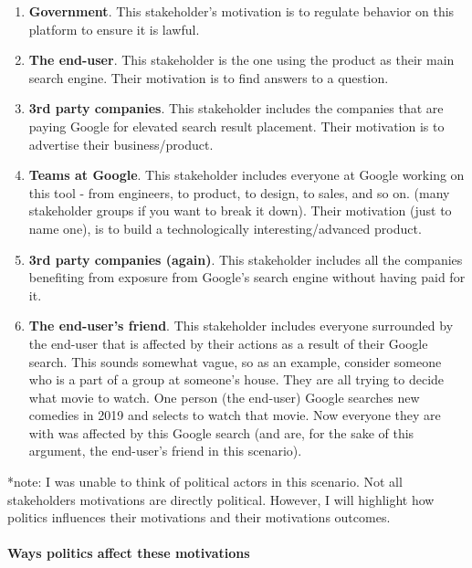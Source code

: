 \begin{enumerate}
\item
  \textbf{Government}. This stakeholder's motivation is to regulate behavior on this platform to ensure it is lawful.
\item
  \textbf{The end-user}. This stakeholder is the one using the product as their main search engine. Their motivation is to find answers to a question.
\item
  \textbf{3rd party companies}. This stakeholder includes the companies that are paying Google for elevated search result placement. Their motivation is to advertise their business/product.
\item
  \textbf{Teams at Google}. This stakeholder includes everyone at Google working on this tool - from engineers, to product, to design, to sales, and so on. (many stakeholder groups if you want to break it down). Their motivation (just to name one), is to build a technologically interesting/advanced product.
\item
  \textbf{3rd party companies (again)}. This stakeholder includes all the companies benefiting from exposure from Google's search engine without having paid for it.
\item
  \textbf{The end-user's friend}. This stakeholder includes everyone surrounded by the end-user that is affected by their actions as a result of their Google search. This sounds somewhat vague, so as an example, consider someone who is a part of a group at someone's house. They are all trying to decide what movie to watch. One person (the end-user) Google searches new comedies in 2019 and selects to watch that movie. Now everyone they are with was affected by this Google search (and are, for the sake of this argument, the end-user's friend in this scenario).
\end{enumerate}

*note: I was unable to think of political actors in this scenario. Not all stakeholders motivations are directly political. However, I will highlight how politics influences their motivations and their motivations outcomes.

\paragraph{Ways politics affect these motivations}

